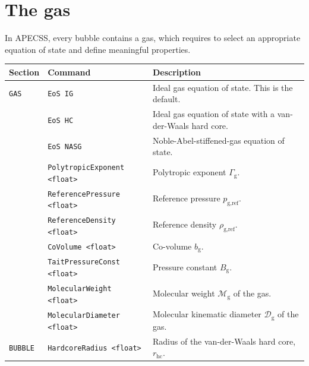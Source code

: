 \section{The gas}
\label{sec:gas}

In APECSS, every bubble contains a gas, which requires to select an appropriate equation of state and define meaningful properties.

\vspace{0.8em}

\noindent
\begin{tabular}{p{} p{} p{}}
    \textbf{Section} &\textbf{Command} & \textbf{Description} 
\vspace{1mm} \\ \hline
{\tt GAS} & {\tt EoS IG} & Ideal gas equation of state. This is the default.\\ 
& {\tt EoS HC} & Ideal gas equation of state with a van-der-Waals hard core.\\ 
& {\tt EoS NASG} & Noble-Abel-stiffened-gas equation of state.\\
& {\tt PolytropicExponent <float>} & Polytropic exponent $\Gamma_\text{g}$.\\
& {\tt ReferencePressure <float>} & Reference pressure $p_\text{g,ref}$.\\
& {\tt ReferenceDensity <float>} & Reference density $\rho_\text{g,ref}$.\\
& {\tt CoVolume <float>} & Co-volume $b_\text{g}$.\\
& {\tt TaitPressureConst <float>} & Pressure constant $B_\text{g}$.\\
& {\tt MolecularWeight <float>} & Molecular weight $\mathcal{M}_{\text{g}}$ of the gas.\\
& {\tt MolecularDiameter <float>} & Molecular kinematic diameter $\mathcal{D}_{\text{g}}$ of the gas.\\
{\tt BUBBLE} & {\tt HardcoreRadius <float>} & Radius of the van-der-Waals hard core, $r_\text{hc}$.\\
 \hline
\end{tabular} \vspace{1em}



